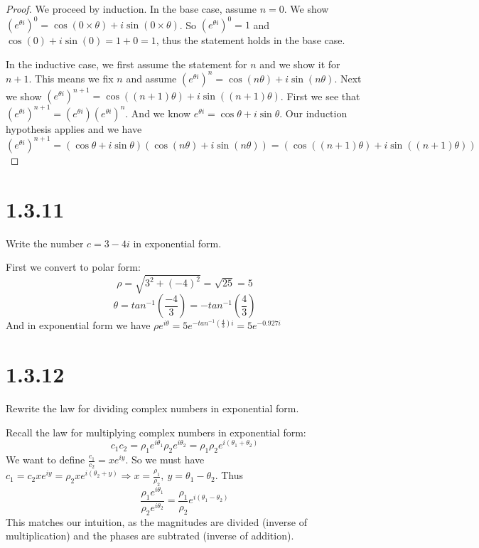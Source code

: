\documentclass[11pt]{article}
\begin{document}
\begin{proof}
	We proceed by induction. 
	In the base case, assume $n=0$. We show $(e^{\theta i})^0 = \cos(0\times \theta) + i \sin(0\times\theta)$.
	So $(e^{\theta i})^0 = 1$ and $\cos(0) + i\sin(0) = 1 + 0 = 1$, thus the statement holds in the base case.

	In the inductive case, we first assume the statement for $n$ and we show it for $n+1$.
	This means we fix $n$ and assume $(e^{\theta i})^n = \cos(n\theta) + i \sin(n\theta)$. 
	Next we show $(e^{\theta i})^{n+1} = \cos((n+1)\theta) + i \sin((n+1)\theta)$.
	First we see that $(e^{\theta i})^{n+1} = (e^{\theta i})(e^{\theta i})^n$. 
	And we know $e^{\theta i} = \cos\theta + i\sin \theta$. Our induction hypothesis applies and we have 
	$$(e^{\theta i})^{n+1} = (\cos\theta + i\sin \theta)(\cos(n\theta) + i \sin(n\theta)) = (\cos((n+1)\theta) + i \sin((n+1)\theta))$$
\end{proof}


\section{1.3.11}
Write the number $c = 3 - 4i$ in exponential form.

First we convert to polar form: 
$$\rho = \sqrt{3^2 + (-4)^2} = \sqrt{25} = 5$$  $$\theta = tan^{-1}(\frac{-4}{3}) = -tan^{-1}(\frac{4}{3})$$
And in exponential form we have $\rho e^{i\theta} = 5e^{-tan^{-1}(\frac{4}{3})i} =  5e^{-0.927i}  $


\section{1.3.12}
Rewrite the law for dividing complex numbers in exponential form.

Recall the law for multiplying complex numbers in exponential form: 
$$c_1c_2 = \rho_1e^{i\theta_1}\rho_2e^{i\theta_2} = \rho_1\rho_2e^{i(\theta_1 + \theta_2)}  $$
We want to define $\frac{c_1}{c_2} = xe^{iy}$. 
So we must have $c_1 = c_2xe^{iy} = \rho_2xe^{i(\theta_2 + y)} \Rightarrow x = \frac{\rho_1}{\rho_2},\ y = \theta_1 - \theta_2$.
Thus $$\frac{\rho_1e^{i\theta_1}}{\rho_2e^{i\theta_2}} = \frac{\rho_1}{\rho_2}e^{i(\theta_1 - \theta_2)}$$
This matches our intuition, as the magnitudes are divided (inverse of multiplication) and the phases are subtrated (inverse of addition).
\end{document}
